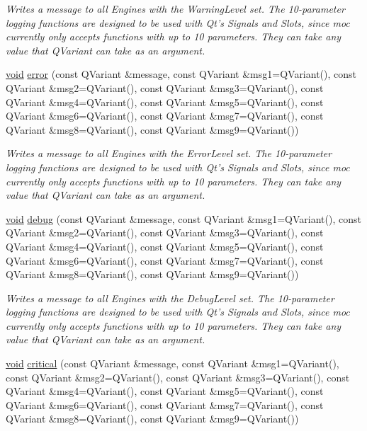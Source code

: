 \begin{DoxyCompactItemize}
\begin{DoxyCompactList}\small\item\em Writes a message to all Engines with the Warning\-Level set. The 10-\/parameter logging functions are designed to be used with Qt's Signals and Slots, since moc currently only accepts functions with up to 10 parameters. They can take any value that Q\-Variant can take as an argument. \end{DoxyCompactList}\item 
\hyperlink{group___u_a_v_objects_plugin_ga444cf2ff3f0ecbe028adce838d373f5c}{void} \hyperlink{class_qxt_logger_ad8be6cb1bc20df36559530406e9d0053}{error} (const Q\-Variant \&message, const Q\-Variant \&msg1=Q\-Variant(), const Q\-Variant \&msg2=Q\-Variant(), const Q\-Variant \&msg3=Q\-Variant(), const Q\-Variant \&msg4=Q\-Variant(), const Q\-Variant \&msg5=Q\-Variant(), const Q\-Variant \&msg6=Q\-Variant(), const Q\-Variant \&msg7=Q\-Variant(), const Q\-Variant \&msg8=Q\-Variant(), const Q\-Variant \&msg9=Q\-Variant())
\begin{DoxyCompactList}\small\item\em Writes a message to all Engines with the Error\-Level set. The 10-\/parameter logging functions are designed to be used with Qt's Signals and Slots, since moc currently only accepts functions with up to 10 parameters. They can take any value that Q\-Variant can take as an argument. \end{DoxyCompactList}\item 
\hyperlink{group___u_a_v_objects_plugin_ga444cf2ff3f0ecbe028adce838d373f5c}{void} \hyperlink{class_qxt_logger_ad169b060f921b21e92de0ace3718093f}{debug} (const Q\-Variant \&message, const Q\-Variant \&msg1=Q\-Variant(), const Q\-Variant \&msg2=Q\-Variant(), const Q\-Variant \&msg3=Q\-Variant(), const Q\-Variant \&msg4=Q\-Variant(), const Q\-Variant \&msg5=Q\-Variant(), const Q\-Variant \&msg6=Q\-Variant(), const Q\-Variant \&msg7=Q\-Variant(), const Q\-Variant \&msg8=Q\-Variant(), const Q\-Variant \&msg9=Q\-Variant())
\begin{DoxyCompactList}\small\item\em Writes a message to all Engines with the Debug\-Level set. The 10-\/parameter logging functions are designed to be used with Qt's Signals and Slots, since moc currently only accepts functions with up to 10 parameters. They can take any value that Q\-Variant can take as an argument. \end{DoxyCompactList}\item 
\hyperlink{group___u_a_v_objects_plugin_ga444cf2ff3f0ecbe028adce838d373f5c}{void} \hyperlink{class_qxt_logger_a85f37e17b7d89f5aa480ead9a9c9e8d4}{critical} (const Q\-Variant \&message, const Q\-Variant \&msg1=Q\-Variant(), const Q\-Variant \&msg2=Q\-Variant(), const Q\-Variant \&msg3=Q\-Variant(), const Q\-Variant \&msg4=Q\-Variant(), const Q\-Variant \&msg5=Q\-Variant(), const Q\-Variant \&msg6=Q\-Variant(), const Q\-Variant \&msg7=Q\-Variant(), const Q\-Variant \&msg8=Q\-Variant(), const Q\-Variant \&msg9=Q\-Variant())

\end{DoxyCompactItemize}
